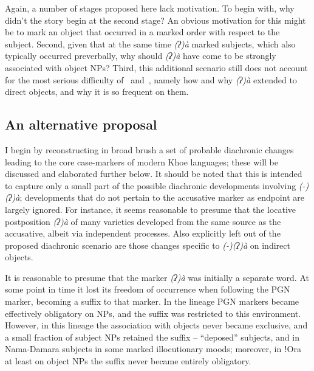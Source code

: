 \documentclass[output=paper]{LSP/langsci}
\begin{document}
Again, a number of stages proposed here lack motivation. To begin with, why didn’t the story begin at the second stage? An obvious motivation for this might be to mark an object that occurred in a marked order with respect to the subject. Second, given that at the same time \textit{(ʔ)à} marked  subjects, which also typically occurred preverbally, why should \textit{(ʔ)à} have come to be strongly associated with object NPs? Third, this additional scenario still does not account for the most serious difficulty of~ and~, namely how and why \textit{(ʔ)à} extended to  direct objects, and why it is so frequent on them.

\subsection{An alternative proposal} \label{09-mc-sec:4-2}
I begin by reconstructing in broad brush a set of probable diachronic changes leading to the core case-markers of modern Khoe languages; these will be discussed and elaborated further below. It should be noted that this is intended to capture only a small part of the possible diachronic developments involving \textit{(-)(ʔ)à}; developments that do not pertain to the accusative marker as endpoint are largely ignored. For instance, it seems reasonable to presume that the locative postposition \textit{(ʔ)à} of many  varieties developed from the same source as the accusative, albeit via independent processes. Also explicitly left out of the proposed diachronic scenario are those changes specific to \textit{(-)(ʔ)à} on indirect objects.

It is reasonable to presume that the marker \textit{(ʔ)à} was initially a separate word. At some point in time it lost its freedom of occurrence when following the PGN marker, becoming a suffix to that marker. In the  lineage PGN markers became effectively obligatory on NPs, and the suffix was restricted to this environment. However, in this lineage the association with objects never became exclusive, and a small fraction of subject NPs retained the suffix – \eg “deposed” subjects, and in Nama-Damara subjects in some marked illocutionary moods; moreover, in ǃOra at least on object NPs the suffix never became entirely obligatory.
\end{document}
